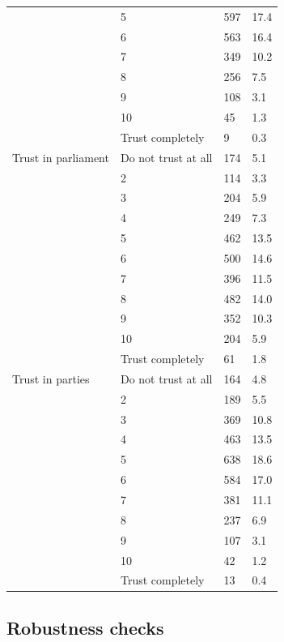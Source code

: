 \documentclass[
]{article}
\begin{document}
\begin{longtable}[t]{llll}
 & 5 & 597 & 17.4\\
\addlinespace
 & 6 & 563 & 16.4\\
 & 7 & 349 & 10.2\\
 & 8 & 256 & 7.5\\
 & 9 & 108 & 3.1\\
 & 10 & 45 & 1.3\\
\addlinespace
 & Trust completely & 9 & 0.3\\
Trust in parliament & Do not trust at all & 174 & 5.1\\
 & 2 & 114 & 3.3\\
 & 3 & 204 & 5.9\\
 & 4 & 249 & 7.3\\
\addlinespace
 & 5 & 462 & 13.5\\
 & 6 & 500 & 14.6\\
 & 7 & 396 & 11.5\\
 & 8 & 482 & 14.0\\
 & 9 & 352 & 10.3\\
\addlinespace
 & 10 & 204 & 5.9\\
 & Trust completely & 61 & 1.8\\
Trust in parties & Do not trust at all & 164 & 4.8\\
 & 2 & 189 & 5.5\\
 & 3 & 369 & 10.8\\
\addlinespace
 & 4 & 463 & 13.5\\
 & 5 & 638 & 18.6\\
 & 6 & 584 & 17.0\\
 & 7 & 381 & 11.1\\
 & 8 & 237 & 6.9\\
\addlinespace
 & 9 & 107 & 3.1\\
 & 10 & 42 & 1.2\\
 & Trust completely & 13 & 0.4\\
\bottomrule
\end{longtable}

\hypertarget{robustness-checks}{%
\subsection*{Robustness checks}\label{robustness-checks}}
\end{document}
